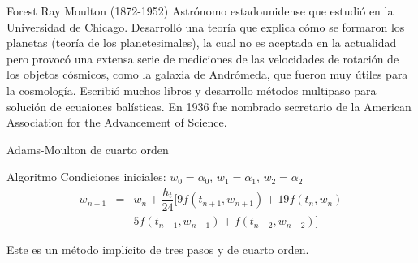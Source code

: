 \documentclass{beamer}
\newtheorem{teorema}{\textit{\textbf{Teorema}}}
\begin{document}
\begin{frame}{Forest Ray Moulton (1872-1952)}
	 Astrónomo estadounidense que estudió en la Universidad de Chicago. \pause Desarrolló una teoría que explica cómo se formaron los planetas (teoría de los planetesimales), la cual no es aceptada en la actualidad pero provocó una extensa serie de mediciones de las velocidades de rotación de los objetos cósmicos, como la galaxia de Andrómeda, que fueron muy útiles para la cosmología. \pause Escribió muchos libros y desarrollo métodos multipaso para solución de ecuaiones balísticas. \pause En 1936 fue nombrado secretario de la American Association for the Advancement of Science. 

\end{frame}

\begin{frame}{Adams-Moulton de cuarto orden}

\begin{block}{Algoritmo}
	Condiciones iniciales: $w_0 = \alpha_0$, $w_1 = \alpha_1$, $w_2 = \alpha_2$
	\begin{eqnarray*}
		w_{n+1} & = & w_n + \dfrac{h_t}{24}\big[ 9 f(t_{n+1},w_{n+1}) + 19 f(t_{n},w_{n})  \\
		& - & 5 f(t_{n-1},w_{n-1}) + f(t_{n-2},w_{n-2})\big]
	\end{eqnarray*}
\end{block}
Este es un método implícito de tres pasos y de cuarto orden.
\end{frame}

%
\end{document}
